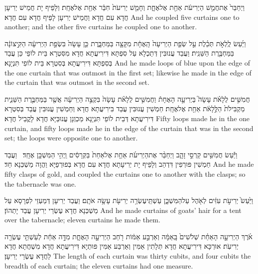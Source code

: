 {וַיְחַבֵּר֙ אֶת\maqqaf חֲמֵ֣שׁ הַיְרִיעֹ֔ת אַחַ֖ת אֶל\maqqaf אֶחָ֑ת וְחָמֵ֤שׁ יְרִיעֹת֙ חִבַּ֔ר אַחַ֖ת אֶל\maqqaf אֶחָֽת׃}
{וְלָפֵיף יָת חֲמֵישׁ יְרִיעָן חֲדָא עִם חֲדָא וַחֲמֵישׁ יְרִיעָן לָפֵיף חֲדָא עִם חֲדָא׃}
{And he coupled five curtains one to another; and the other five curtains he coupled one to another.}{}

{וַיַּ֜עַשׂ לֻֽלְאֹ֣ת תְּכֵ֗לֶת עַ֣ל שְׂפַ֤ת הַיְרִיעָה֙ הָֽאֶחָ֔ת מִקָּצָ֖ה בַּמַּחְבָּ֑רֶת כֵּ֤ן עָשָׂה֙ בִּשְׂפַ֣ת הַיְרִיעָ֔ה הַקִּ֣יצוֹנָ֔ה בַּמַּחְבֶּ֖רֶת הַשֵּׁנִֽית׃}
{וַעֲבַד עֲנוּבִּין דְּתַכְלָא עַל סִפְתָּא דִּירִיעֲתָא חֲדָא מִסִּטְרָא בֵּית לוֹפֵי כֵּן עֲבַד בְּסִפְתָּא דִּירִיעֲתָא בְּסִטְרָא בֵּית לוֹפִי תִּנְיָנָא׃}
{And he made loops of blue upon the edge of the one curtain that was outmost in the first set; likewise he made in the edge of the curtain that was outmost in the second set.}{}

{חֲמִשִּׁ֣ים לֻלָאֹ֗ת עָשָׂה֮ בַּיְרִיעָ֣ה הָאֶחָת֒ וַחֲמִשִּׁ֣ים לֻלָאֹ֗ת עָשָׂה֙ בִּקְצֵ֣ה הַיְרִיעָ֔ה אֲשֶׁ֖ר בַּמַּחְבֶּ֣רֶת הַשֵּׁנִ֑ית מַקְבִּילֹת֙ הַלֻּ֣לָאֹ֔ת אַחַ֖ת אֶל\maqqaf אֶחָֽת׃}
{חַמְשִׁין עֲנוּבִּין עֲבַד בִּירִיעֲתָא חֲדָא וְחַמְשִׁין עֲנוּבִּין עֲבַד בְּסִטְרָא דִּירִיעֲתָא דְּבֵית לוֹפֵי תִּנְיָנָא מַכְוְנָן עֲנוּבַּיָּא חֲדָא לָקֳבֵיל חֲדָא׃}
{Fifty loops made he in the one curtain, and fifty loops made he in the edge of the curtain that was in the second set; the loops were opposite one to another.}{}

{וַיַּ֕עַשׂ חֲמִשִּׁ֖ים קַרְסֵ֣י זָהָ֑ב וַיְחַבֵּ֨ר אֶת\maqqaf הַיְרִיעֹ֜ת אַחַ֤ת אֶל\maqqaf אַחַת֙ בַּקְּרָסִ֔ים וַֽיְהִ֥י הַמִּשְׁכָּ֖ן אֶחָֽד׃ \petucha }
{וַעֲבַד חַמְשִׁין פּוּרְפִין דִּדְהַב וְלָפֵיף יָת יְרִיעָתָא חֲדָא עִם חֲדָא בְּפוּרְפַיָּא וַהֲוָה מַשְׁכְּנָא חַד׃}
{And he made fifty clasps of gold, and coupled the curtains one to another with the clasps; so the tabernacle was one.}{}

{וַיַּ֙עַשׂ֙ יְרִיעֹ֣ת עִזִּ֔ים לְאֹ֖הֶל עַל\maqqaf הַמִּשְׁכָּ֑ן עַשְׁתֵּֽי\maqqaf עֶשְׂרֵ֥ה יְרִיעֹ֖ת עָשָׂ֥ה אֹתָֽם׃}
{וַעֲבַד יְרִיעָן דְּמַעְזֵי לִפְרָסָא עַל מַשְׁכְּנָא חֲדָא עֶשְׂרֵי יְרִיעָן עֲבַד יָתְהוֹן׃}
{And he made curtains of goats’ hair for a tent over the tabernacle; eleven curtains he made them.}{}

{אֹ֜רֶךְ הַיְרִיעָ֣ה הָאַחַ֗ת שְׁלֹשִׁים֙ בָּֽאַמָּ֔ה וְאַרְבַּ֣ע אַמּ֔וֹת רֹ֖חַב הַיְרִיעָ֣ה הָאֶחָ֑ת מִדָּ֣ה אַחַ֔ת לְעַשְׁתֵּ֥י עֶשְׂרֵ֖ה יְרִיעֹֽת׃}
{אוּרְכָּא דִּירִיעֲתָא חֲדָא תְּלָתִין אַמִּין וְאַרְבַּע אַמִּין פּוּתְיָא דִּירִיעֲתָא חֲדָא מִשְׁחֲתָא חֲדָא לַחֲדָא עֶשְׂרֵי יְרִיעָן׃}
{The length of each curtain was thirty cubits, and four cubits the breadth of each curtain; the eleven curtains had one measure.}{}

